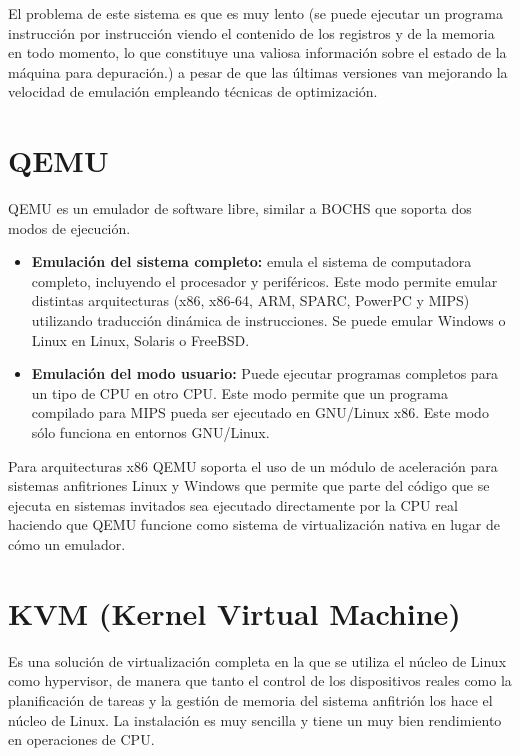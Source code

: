 \documentclass[10pt,a4paper,spanish]{report}
\begin{document}
  \noindent
  El problema de este sistema es que es muy lento (se puede ejecutar un programa instrucción por instrucción viendo el contenido de los registros y de la memoria en todo momento, lo que constituye una valiosa información sobre el estado de la máquina para depuración.) a pesar de que las últimas versiones van mejorando la velocidad de emulación empleando técnicas de optimización.

  \section{QEMU}

  \noindent
  QEMU es un emulador de software libre, similar a BOCHS que soporta dos modos de ejecución. \\

  \begin{itemize}
    \item \textbf{Emulación del sistema completo: } emula el sistema de computadora completo, incluyendo el procesador y periféricos. Este modo permite emular distintas arquitecturas (x86, x86-64, ARM, SPARC, PowerPC y MIPS) utilizando traducción dinámica de instrucciones. Se puede emular Windows o Linux en Linux, Solaris o FreeBSD.

    \item \textbf{Emulación del modo usuario: } Puede ejecutar programas completos para un tipo de CPU en otro CPU. Este modo permite que un programa compilado para MIPS pueda ser ejecutado en GNU/Linux x86. Este modo sólo funciona en entornos GNU/Linux.
  \end{itemize}

  \noindent
  Para arquitecturas x86 QEMU soporta el uso de un módulo de aceleración para sistemas anfitriones Linux y Windows que permite que parte del código que se ejecuta en sistemas invitados sea ejecutado directamente por la CPU real haciendo que QEMU funcione como sistema de virtualización nativa en lugar de cómo un emulador.

  \section{KVM (Kernel Virtual Machine)}

  \noindent
  Es una solución de virtualización completa en la que se utiliza el núcleo de Linux como hypervisor, de manera que tanto el control de los dispositivos reales como la planificación de tareas y la gestión de memoria del sistema anfitrión los hace el núcleo de Linux. La instalación es muy sencilla y tiene un muy bien rendimiento en operaciones de CPU. \\
\end{document}
